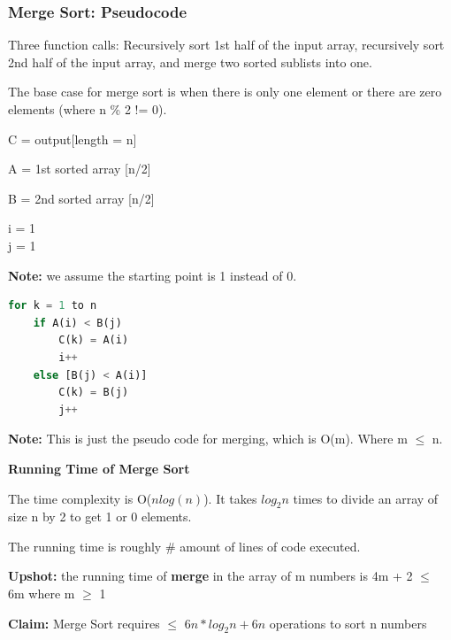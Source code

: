 \documentclass[11pt]{article}
\newenvironment{aside}
  {\begin{mdframed}[style=0,%
      leftline=false,rightline=false,leftmargin=2em,rightmargin=2em,%
          innerleftmargin=0pt,innerrightmargin=0pt,linewidth=0.75pt,%
      skipabove=7pt,skipbelow=7pt]\small}
  {\end{mdframed}}
\begin{document}
\vspace{11pt}
\subsubsection{Merge Sort: Pseudocode}

Three function calls: Recursively sort 1st half of the input array, recursively sort 2nd half of the input array, and merge two sorted sublists into one.

The base case for merge sort is when there is only one element or there are zero elements (where n \% 2 != 0).

C = output[length = n]

A = 1st sorted array [n/2]

B = 2nd sorted array [n/2]

i = 1
\\
j = 1
\vspace{11pt}
\begin{aside}
    \textbf{Note:} we assume the starting point is 1 instead of 0.
\end{aside}
\vspace{11pt}

\begin{lstlisting}[language=Python]
for k = 1 to n  
    if A(i) < B(j)
        C(k) = A(i)
        i++
    else [B(j) < A(i)]
        C(k) = B(j)
        j++

\end{lstlisting}
\vspace{11pt}
\vspace{11pt}
\begin{aside}
    \textbf{Note:} This is just the pseudo code for merging, which is O(m). Where m $\leq$ n.
\end{aside}
\vspace{11pt}

\textbf{Running Time of Merge Sort}
\vspace{11pt}

The time complexity is O(\(nlog(n)\)). It takes \(log_2n\) times to divide an array of size n by 2 to get 1 or 0 elements.

The running time is roughly \# amount of lines of code executed.

\textbf{Upshot:} the running time of \textbf{merge} in the array of m numbers is 4m + 2 $\leq$ 6m where m $\geq$ 1

\textbf{Claim:} Merge Sort requires $\leq$ \(6n*log_2n + 6n\)  operations to sort n numbers
\end{document}
